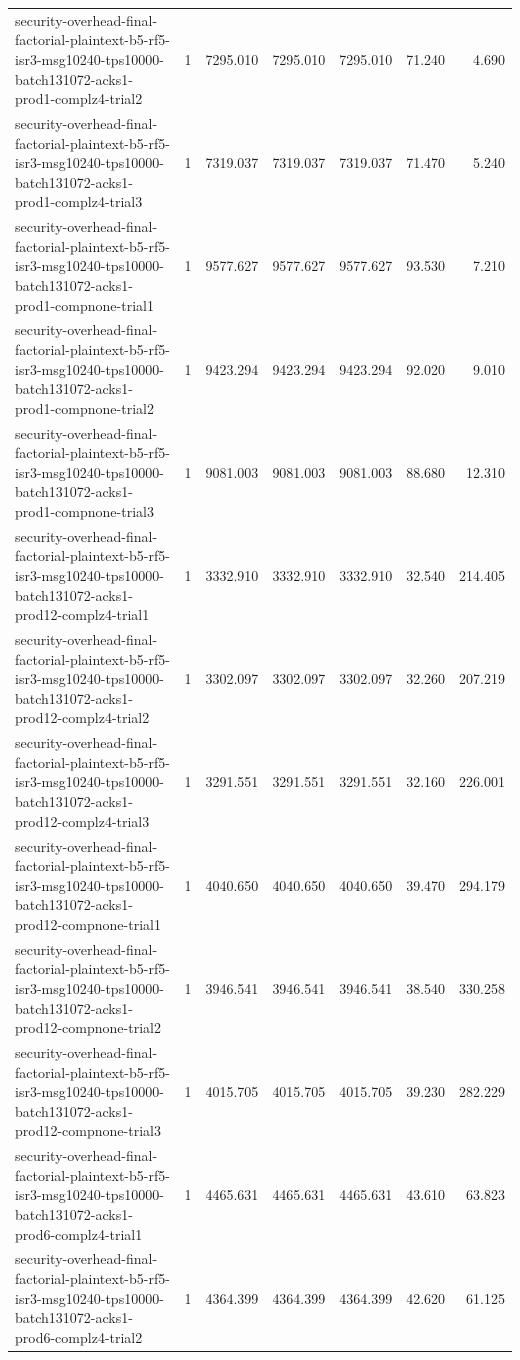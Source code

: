 \begin{tabular}{lrrrrrr}
security-overhead-final-factorial-plaintext-b5-rf5-isr3-msg10240-tps10000-batch131072-acks1-prod1-complz4-trial2 & 1 & 7295.010 & 7295.010 & 7295.010 & 71.240 & 4.690 \\
security-overhead-final-factorial-plaintext-b5-rf5-isr3-msg10240-tps10000-batch131072-acks1-prod1-complz4-trial3 & 1 & 7319.037 & 7319.037 & 7319.037 & 71.470 & 5.240 \\
security-overhead-final-factorial-plaintext-b5-rf5-isr3-msg10240-tps10000-batch131072-acks1-prod1-compnone-trial1 & 1 & 9577.627 & 9577.627 & 9577.627 & 93.530 & 7.210 \\
security-overhead-final-factorial-plaintext-b5-rf5-isr3-msg10240-tps10000-batch131072-acks1-prod1-compnone-trial2 & 1 & 9423.294 & 9423.294 & 9423.294 & 92.020 & 9.010 \\
security-overhead-final-factorial-plaintext-b5-rf5-isr3-msg10240-tps10000-batch131072-acks1-prod1-compnone-trial3 & 1 & 9081.003 & 9081.003 & 9081.003 & 88.680 & 12.310 \\
security-overhead-final-factorial-plaintext-b5-rf5-isr3-msg10240-tps10000-batch131072-acks1-prod12-complz4-trial1 & 1 & 3332.910 & 3332.910 & 3332.910 & 32.540 & 214.405 \\
security-overhead-final-factorial-plaintext-b5-rf5-isr3-msg10240-tps10000-batch131072-acks1-prod12-complz4-trial2 & 1 & 3302.097 & 3302.097 & 3302.097 & 32.260 & 207.219 \\
security-overhead-final-factorial-plaintext-b5-rf5-isr3-msg10240-tps10000-batch131072-acks1-prod12-complz4-trial3 & 1 & 3291.551 & 3291.551 & 3291.551 & 32.160 & 226.001 \\
security-overhead-final-factorial-plaintext-b5-rf5-isr3-msg10240-tps10000-batch131072-acks1-prod12-compnone-trial1 & 1 & 4040.650 & 4040.650 & 4040.650 & 39.470 & 294.179 \\
security-overhead-final-factorial-plaintext-b5-rf5-isr3-msg10240-tps10000-batch131072-acks1-prod12-compnone-trial2 & 1 & 3946.541 & 3946.541 & 3946.541 & 38.540 & 330.258 \\
security-overhead-final-factorial-plaintext-b5-rf5-isr3-msg10240-tps10000-batch131072-acks1-prod12-compnone-trial3 & 1 & 4015.705 & 4015.705 & 4015.705 & 39.230 & 282.229 \\
security-overhead-final-factorial-plaintext-b5-rf5-isr3-msg10240-tps10000-batch131072-acks1-prod6-complz4-trial1 & 1 & 4465.631 & 4465.631 & 4465.631 & 43.610 & 63.823 \\
security-overhead-final-factorial-plaintext-b5-rf5-isr3-msg10240-tps10000-batch131072-acks1-prod6-complz4-trial2 & 1 & 4364.399 & 4364.399 & 4364.399 & 42.620 & 61.125 \\

\end{tabular}
